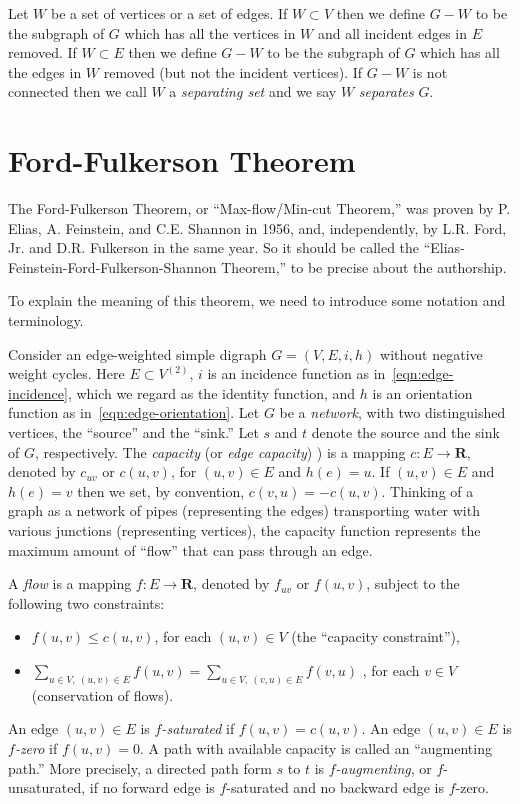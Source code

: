 Let $W$ be a set of vertices or a set of edges.
If $W\subset V$ then we define $G-W$ to be the subgraph
of $G$ which has all the vertices in $W$ and all incident
edges in $E$ removed.  If $W\subset E$ then we define $G-W$ to be the subgraph
of $G$ which has all the edges in $W$ removed
(but not the incident vertices).
If $G-W$ is not connected then we call $W$ a
{\it separating set} and we say $W$ {\it separates} $G$.

\section{Ford-Fulkerson Theorem}

The Ford-Fulkerson Theorem, or ``Max-flow/Min-cut Theorem,''
was proven by P. Elias, A. Feinstein, and C.E. Shannon in 1956, and,
independently, by L.R. Ford, Jr.  and D.R. Fulkerson in the same year.
So it should be called the
``Elias-Feinstein-Ford-Fulkerson-Shannon Theorem,''
to be precise about the authorship.

To explain the meaning of this theorem, we need to introduce some
notation and  terminology.

Consider an edge-weighted simple
digraph $G=(V,E,i,h)$ without negative weight
cycles. Here $E\subset V^{(2)}$,
$i$ is an incidence function as in~\eqref{eqn:edge-incidence}, which
we regard as the identity function, and $h$ is an
orientation function as in~\eqref{eqn:edge-orientation}.
Let $G$ be a {\it network},
with two distinguished vertices, the ``source'' and the ``sink.''
Let $s$ and $t$ denote the source and the sink of $G$, respectively.
The {\it capacity} (or {\it edge capacity})
)
is a mapping $c: E \to {\mathbf{R}}$, denoted by $c_{uv}$
or $c(u,v)$, for $(u,v)\in E$ and $h(e)= u$.
If $(u,v)\in E$ and $h(e)= v$
then we set, by convention, $c(v,u)=-c(u,v)$.
Thinking of a graph as a network of pipes (representing the edges)
transporting water with various junctions (representing vertices),
the capacity function represents the maximum amount
of ``flow'' that can pass through an edge.

A {\it flow}
is a mapping $f: E \to {\mathbf{R}}$, denoted by $f_{uv}$ or
$f(u,v)$, subject to the following two constraints:
\begin{itemize}
\item
$f(u,v)\leq c(u,v)$, for each $(u,v) \in V$ (the ``capacity constraint''),
\item
$\sum_{u\in V,\ (u,v)\in E} f(u,v) = \sum_{u\in V,\ (v, u)\in E} f(v, u)$ ,
for each $v\in V$ (conservation of flows).
\end{itemize}
An edge $(u,v) \in E$ is {\it $f$-saturated}
if $f(u,v)=c(u,v)$.
An edge $(u,v) \in E$ is {\it $f$-zero} if $f(u,v)=0$.
A path with available capacity is called an ``augmenting path.''
More precisely, a directed path form $s$ to $t$ is
{\it $f$-augmenting}, or
$f$-unsaturated, if no forward
edge is $f$-saturated and no backward edge is $f$-zero.

